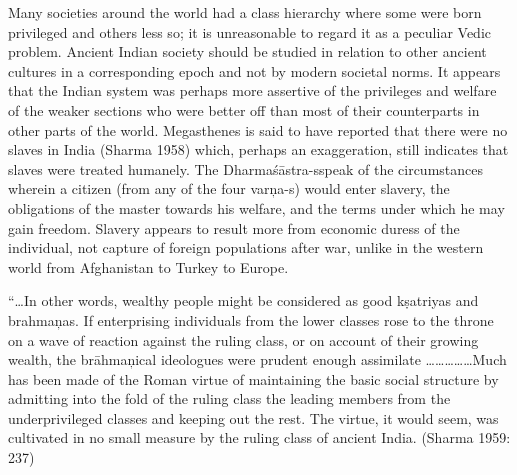 Many societies around the world had a class hierarchy where some were born privileged and others less so; it is unreasonable to regard it as a peculiar Vedic problem. Ancient Indian society should be studied in relation to other ancient cultures in a corresponding epoch and not by modern societal norms. It appears that the Indian system was perhaps more assertive of the privileges and welfare of the weaker sections who were better off than most of their counterparts in other parts of the world. Megasthenes is said to have reported that there were no slaves in India (Sharma 1958) which, perhaps an exaggeration, still indicates that slaves were treated humanely. The Dharmaśāstra-s\break speak of the circumstances wherein a citizen (from any of the four varņa-s) would enter slavery, the obligations of the master towards his welfare, and the terms under which he may gain freedom. Slavery appears to result more from economic duress of the individual, not capture of foreign populations after war, unlike in the western world from Afghanistan to Turkey to Europe.

\begin{myquote}
“…In other words, wealthy people might be considered as good kṣatriyas and brahmaņas. If enterprising individuals from the lower classes rose to the throne on a wave of reaction against the ruling class, or on account of their growing wealth, the brāhmaņical ideologues were prudent enough assimilate ……………Much has been made of the Roman virtue of maintaining the basic social structure by admitting into the fold of the ruling class the leading members from the underprivileged classes and keeping out the rest. The virtue, it would seem, was cultivated in no small measure by the ruling class of ancient India. (Sharma 1959: 237)
\end{myquote}

